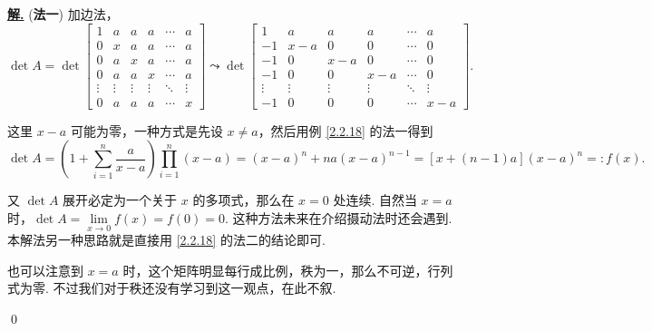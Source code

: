 \documentclass[10pt,openany]{article}
\theoremstyle{thmstyle} %
\theoremstyle{defstyle} %
\theoremstyle{prostyle} %
\theoremstyle{exastyle}
\theoremstyle{remstyle}
\newenvironment{solution}{\par\underline{\textbf{解.}} \;\fangsong}{\qed\par}
\begin{document}
\begin{solution}
	(\textbf{法一}) 加边法，
	\[ \det A= \det \begin{bmatrix}
		1 & a & a & a & \cdots & a \\
		0 & x & a & a & \cdots & a \\
		0 & a & x & a & \cdots & a \\
		0 & a & a & x & \cdots & a \\
		\vdots & \vdots & \vdots & \vdots & \ddots & \vdots \\
		0 & a & a & a & \cdots & x
	\end{bmatrix} \leadsto  \det \begin{bmatrix}
	1 & a & a & a & \cdots & a \\
	-1 & x-a & 0 & 0 & \cdots & 0 \\
	-1 & 0 & x-a & 0 & \cdots & 0 \\
	-1 & 0 & 0 & x-a & \cdots & 0 \\
	\vdots & \vdots & \vdots & \vdots & \ddots & \vdots \\
	-1 & 0 & 0 & 0 & \cdots & x-a
	\end{bmatrix}. \]
	
	这里 \( x-a \) 可能为零，一种方式是先设 \( x \neq a \)，然后用例 \ref{2.2.18} 的法一得到
	\[ \det A= \left( 1+ \sum_{i=1}^{n}\frac{a}{x-a} \right) \prod_{i=1}^{n} (x-a)= (x-a)^n+na(x-a)^{n-1}=[x+(n-1)a](x-a)^n=:f(x). \]
	
	又 \( \det A \) 展开必定为一个关于 \( x \) 的多项式，那么在 \( x=0 \) 处连续. 自然当 \( x=a \) 时，\( \det A=\lim\limits_{x \to 0} f(x)=f(0)=0 \). 这种方法未来在介绍摄动法时还会遇到. 本解法另一种思路就是直接用 \ref{2.2.18} 的法二的结论即可. 
	
	也可以注意到 \( x=a \) 时，这个矩阵明显每行成比例，秩为一，那么不可逆，行列式为零. 不过我们对于秩还没有学习到这一观点，在此不叙.
	
	\vspace{1ex}
	

\end{solution}
\end{document}
